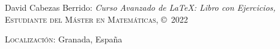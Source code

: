 \thispagestyle{empty}

\vspace*{\fill}
\begin{flushleft}
    David Cabezas Berrido: \textit{Curso Avanzado de \LaTeX: Libro con Ejercicios,} {\scshape
    \lsstyle Estudiante del Máster en Matemáticas,} \copyright \ 2022
    
    \smallskip
    
    {\scshape
    \lsstyle Localización:} Granada, España
\end{flushleft}